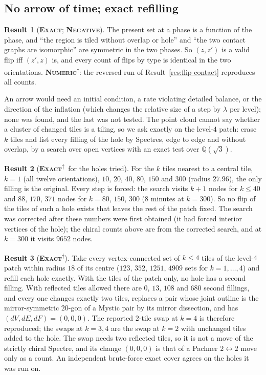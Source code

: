 \documentclass[11pt]{article}
\newcommand{\exact}{\textbf{\textsc{Exact}}}
\newcommand{\numeric}{\textbf{\textsc{Numeric}}}
\newcommand{\negres}{\textbf{\textsc{Negative}}}
\newcommand{\snap}{\textsuperscript{$\dagger$}}      %
\theoremstyle{definition}
\newtheorem{result}{Result}
\begin{document}
\subsection{No arrow of time; exact refilling}
\begin{result}[\exact; \negres]\label{res:flip-symmetry}
The present set at a phase is a function of the phase, and ``the region is tiled without overlap or hole'' and ``the two contact graphs are isomorphic'' are symmetric in the two phases. So $(z,z')$ is a valid flip iff $(z',z)$ is, and every count of flips by type is identical in the two orientations. \numeric\snap: the reversed run of Result~\ref{res:flip-contact} reproduces all counts.
\end{result}
An arrow would need an initial condition, a rate violating detailed balance, or the direction of the inflation (which changes the relative size of a step by $\lambda$ per level); none was found, and the last was not tested.
The point cloud cannot say whether a cluster of changed tiles is a tiling, so we ask exactly on the level-$4$ patch: erase $k$ tiles and list every filling of the hole by Spectres, edge to edge and without overlap, by a search over open vertices with an exact test over $\mathbb{Q}(\sqrt3)$.
\begin{result}[\exact\snap\ for the holes tried]\label{res:flip-cavity}
For the $k$ tiles nearest to a central tile, $k=1$ (all twelve orientations), $10$, $20$, $40$, $80$, $150$ and $300$ (radius $27.96$), the only filling is the original. Every step is forced: the search visits $k+1$ nodes for $k\le40$ and $88$, $170$, $371$ nodes for $k=80$, $150$, $300$ ($8$ minutes at $k=300$). So no flip of the tiles of such a hole exists that leaves the rest of the patch fixed. The search was corrected after these numbers were first obtained (it had forced interior vertices of the hole); the chiral counts above are from the corrected search, and at $k=300$ it visits $9652$ nodes.
\end{result}
\begin{result}[\exact\snap]\label{res:swap}
Take every vertex-connected set of $k\le4$ tiles of the level-$4$ patch within radius $18$ of its centre ($123$, $352$, $1251$, $4909$ sets for $k=1,\dots,4$) and refill each hole exactly. With the tiles of the patch only, no hole has a second filling. With reflected tiles allowed there are $0$, $13$, $108$ and $680$ second fillings, and every one changes exactly two tiles, replaces a pair whose joint outline is the mirror-symmetric $20$-gon of a Mystic pair by its mirror dissection, and has $(dV,dE,dF)=(0,0,0)$. The reported $2$-tile swap at $k=4$ is therefore reproduced; the swaps at $k=3,4$ are the swap at $k=2$ with unchanged tiles added to the hole. The swap needs two reflected tiles, so it is not a move of the strictly chiral Spectre, and its change $(0,0,0)$ is that of a Pachner $2\leftrightarrow2$ move only as a count. An independent brute-force exact cover agrees on the holes it was run on.
\end{result}
\end{document}

